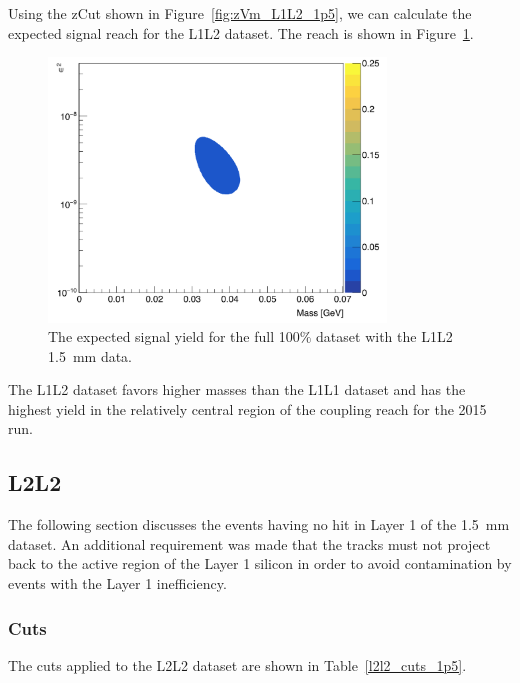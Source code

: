 \documentclass[twoside]{article}
\begin{document}
Using the zCut shown in Figure~\ref{fig:zVm_L1L2_1p5}, we can calculate the expected signal reach for the L1L2 dataset. The reach is shown in Figure~\ref{fig:reach1p5_l1l2}.

\begin{figure}[H]
  \centering
     \includegraphics[width=0.8\textwidth]{plots/reachL1L2_1p5.png}
  \caption{The expected signal yield for the full 100$\%$ dataset with the L1L2 1.5~mm data.}
  \label{fig:reach1p5_l1l2}
\end{figure} 

The L1L2 dataset favors higher masses than the L1L1 dataset and has the highest yield in the relatively central region of the coupling reach for the 2015 run. 

\subsection{L2L2}

The following section discusses the events having no hit in Layer 1 of the 1.5~mm dataset. An additional requirement was made that the tracks must not project back to the active region of the Layer 1 silicon in order to avoid contamination by events with the Layer 1 inefficiency. 

\subsubsection{Cuts}

The cuts applied to the L2L2 dataset are shown in Table~\ref{l2l2_cuts_1p5}.
\end{document}
